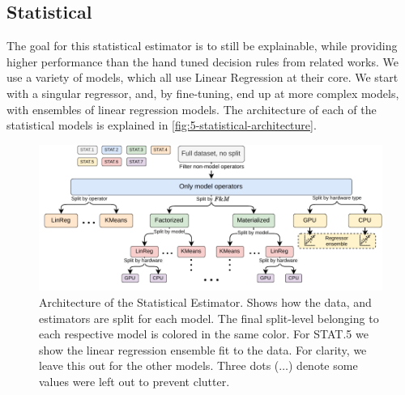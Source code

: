 \subsection{Statistical}
The goal for this statistical estimator is to still be explainable, while providing higher performance than the hand tuned decision rules from related works. We use a variety of models, which all use Linear Regression at their core. We start with a singular regressor, and, by fine-tuning, end up at more complex models, with ensembles of linear regression models. The architecture of each of the statistical models is explained in \autoref{fig:5-statistical-architecture}.



\begin{figure}[ht]
    \centering
    \includegraphics[width=\linewidth]{chapters/05_cost_estimation/figures/statistical-architecture.pdf}
    \caption[Statistical Estimator Architecture]{Architecture of the Statistical Estimator. Shows how the data, and estimators are split for each model. The final split-level belonging to each respective model is colored in the same color. For STAT.5 we show the linear regression ensemble fit to the data. For clarity, we leave this out for the other models. Three dots ($\boldsymbol{\ldots}$) denote some values were left out to prevent clutter.}
    \label{fig:5-statistical-architecture}
\end{figure}


